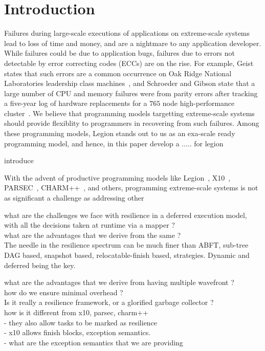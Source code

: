 \section{Introduction}

Failures during large-scale executions of applications on extreme-scale systems
lead to loss of time and money, and are a nightmare to any application
developer. While failures could be due to application bugs, failures due
to errors not detectable by error correcting codes (ECCs) are on the rise.  For
example, Geist states that such errors are a common occurrence on Oak Ridge
National Laboratories leadership class machines~\cite{errors_ecc}, and
Schroeder and Gibson state that a large number of CPU and memory failures were
from parity errors after tracking a five-year log of hardware replacements for
a $765$ node high-performance cluster~\cite{schroeder_gibson}. We believe that
programming models targetting extreme-scale systems should provide flexiblity
to programmers in recovering from such failures. Among these programming models,
Legion stands out to us as an exa-scale ready programming model, and hence, in
this paper develop a ..... for legion


introduce 

With the advent of productive programming models like Legion~\cite{legion}, X10~\cite{x10}, 
PARSEC~\cite{parsec}, CHARM++~\cite{charm++}, and others, programming extreme-scale
systems is not as significant a challenge as addressing other 




what are the challenges we face with resilience in a deferred execution model,
with all the decisions taken at runtime via a mapper ? \\

what are the advantages that we derive from the same ?\\ The needle in the
resilience spectrum can be much finer than ABFT, sub-tree DAG based, snapshot
based, relocatable-finish based, strategies. Dynamic and deferred being the
key.

what are the advantages that we derive from having multiple wavefront ?\\ how
do we ensure minimal overhead ?\\

Is it really a resilience framework, or a glorified garbage collector ?\\


how is it different from x10, parsec, charm++\\
	- they also allow tasks to be marked as resilience\\
	- x10 allows finish blocks, exception semantics.\\
	- what are the exception semantics that we are providing\\


